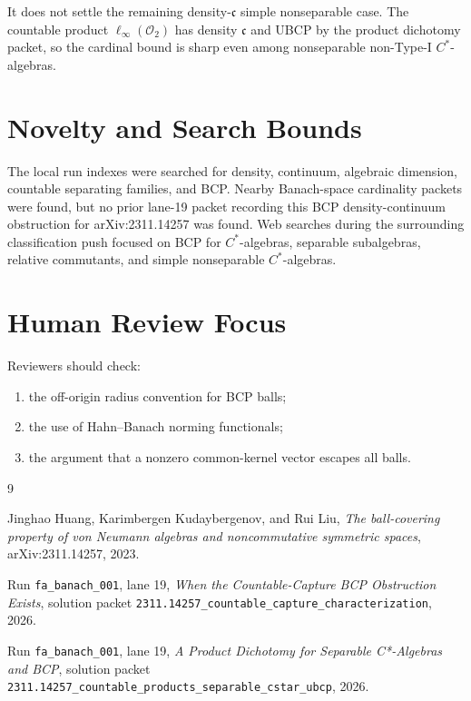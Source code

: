 \documentclass[11pt]{article}
\begin{document}
It does not settle the remaining density-\(\mathfrak c\) simple
nonseparable case.  The countable product \(\ell_\infty(\mathcal O_2)\) has
density \(\mathfrak c\) and UBCP by the product dichotomy packet, so the
cardinal bound is sharp even among nonseparable non-Type-I \(C^*\)-algebras.

\section*{Novelty and Search Bounds}

The local run indexes were searched for density, continuum, algebraic
dimension, countable separating families, and BCP.  Nearby Banach-space
cardinality packets were found, but no prior lane-19 packet recording this
BCP density-continuum obstruction for arXiv:2311.14257 was found.  Web
searches during the surrounding classification push focused on BCP for
\(C^*\)-algebras, separable subalgebras, relative commutants, and simple
nonseparable \(C^*\)-algebras.

\section*{Human Review Focus}

Reviewers should check:
\begin{enumerate}
    \item the off-origin radius convention for BCP balls;
    \item the use of Hahn--Banach norming functionals;
    \item the argument that a nonzero common-kernel vector escapes all balls.
\end{enumerate}

\begin{thebibliography}{9}

Jinghao Huang, Karimbergen Kudaybergenov, and Rui Liu,
\emph{The ball-covering property of von Neumann algebras and noncommutative
symmetric spaces},
arXiv:2311.14257, 2023.

Run \texttt{fa\_banach\_001}, lane 19,
\emph{When the Countable-Capture BCP Obstruction Exists},
solution packet
\texttt{2311.14257\_countable\_capture\_characterization}, 2026.

Run \texttt{fa\_banach\_001}, lane 19,
\emph{A Product Dichotomy for Separable C*-Algebras and BCP},
solution packet
\texttt{2311.14257\_countable\_products\_separable\_cstar\_ubcp}, 2026.

\end{thebibliography}
\end{document}
